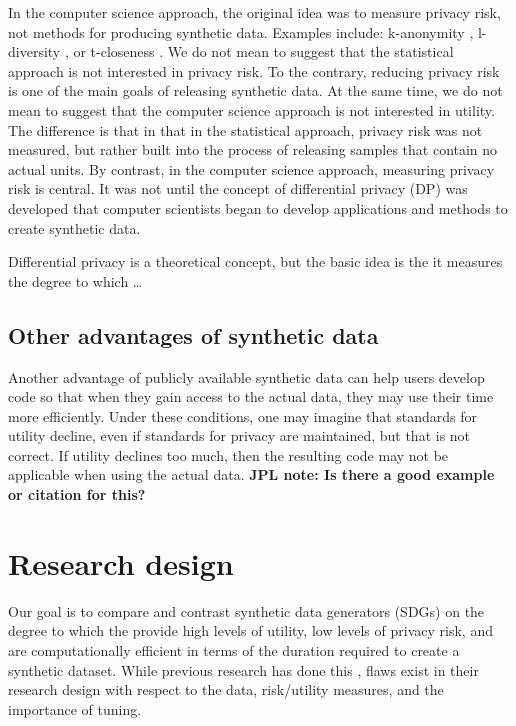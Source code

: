 \documentclass[runningheads]{llncs}
\begin{document}
In the computer science approach, the original idea was to measure privacy risk, not methods for producing synthetic data.  Examples include: k-anonymity \citep{sweeney2002k}, l-diversity \citep{machanavajjhala2007diversity}, or t-closeness \citep{li2006t}.  We do not mean to suggest that the statistical approach is not interested in privacy risk.  To the contrary, reducing privacy risk is one of the main goals of releasing synthetic data.  At the same time, we do not mean to suggest that the computer science approach is not interested in utility.  The difference is that in that in the statistical approach, privacy risk was not measured, but rather built into the process of releasing samples that contain no actual units.  By contrast, in the computer science approach, measuring privacy risk is central.  It was not until the concept of differential privacy (DP) \citep{dwork2006calibrating} was developed that computer scientists began to develop applications and methods to create synthetic data.  

Differential privacy is a theoretical concept, but the basic idea is the it measures the degree to which \dots


\subsection{Other advantages of synthetic data}

Another advantage of publicly available synthetic data can help users develop code so that when they gain access to the actual data, they may use their time more efficiently.  Under these conditions, one may imagine that standards for utility decline, even if standards for privacy are maintained, but that is not correct.  If utility declines too much, then the resulting code may not be applicable when using the actual data.  {\bf JPL note: Is there a good example or citation for this?}

\section{Research design}

Our goal is to compare and contrast synthetic data generators (SDGs) on the degree to which the provide high levels of utility, low levels of privacy risk, and are computationally efficient in terms of the duration required to create a synthetic dataset.  While previous research has done this \citep{little2022comparing,dankar2021fake}, flaws exist in their research design with respect to the data, risk/utility measures, and the importance of tuning.  
\end{document}
